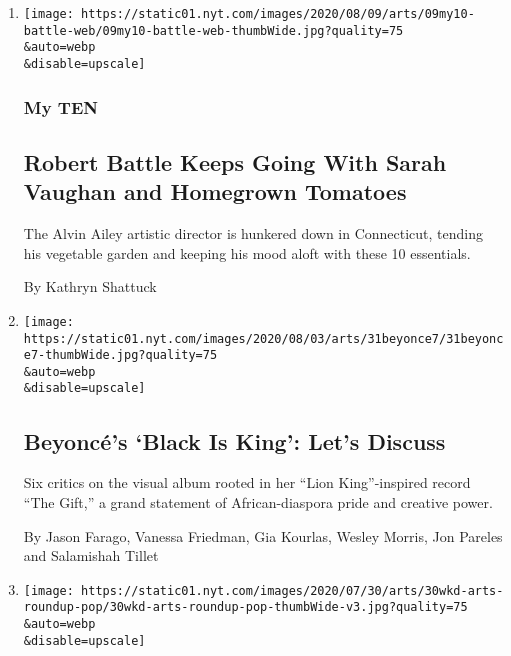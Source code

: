 \begin{enumerate}
\def\labelenumi{\arabic{enumi}.}
\item
  \href{/2020/08/04/arts/dance/robert-battle-favorites.html}{}

  \texttt{[image: https://static01.nyt.com/images/2020/08/09/arts/09my10-battle-web/09my10-battle-web-thumbWide.jpg?quality=75\\\&auto=webp\\\&disable=upscale]}

  \hypertarget{my-ten}{%
  \subsubsection{My TEN}\label{my-ten}}

  \hypertarget{robert-battle-keeps-going-with-sarah-vaughan-and-homegrown-tomatoes}{%
  \subsection{Robert Battle Keeps Going With Sarah Vaughan and Homegrown
  Tomatoes}\label{robert-battle-keeps-going-with-sarah-vaughan-and-homegrown-tomatoes}}

  The Alvin Ailey artistic director is hunkered down in Connecticut,
  tending his vegetable garden and keeping his mood aloft with these 10
  essentials.

  By Kathryn Shattuck
\item
  \href{/2020/07/31/arts/music/beyonce-black-is-king.html}{}

  \texttt{[image: https://static01.nyt.com/images/2020/08/03/arts/31beyonce7/31beyonce7-thumbWide.jpg?quality=75\\\&auto=webp\\\&disable=upscale]}

  \hypertarget{beyoncuxe9s-black-is-king-lets-discuss}{%
  \subsection{Beyoncé's `Black Is King': Let's
  Discuss}\label{beyoncuxe9s-black-is-king-lets-discuss}}

  Six critics on the visual album rooted in her ``Lion King''-inspired
  record ``The Gift,'' a grand statement of African-diaspora pride and
  creative power.

  By Jason Farago, Vanessa Friedman, Gia Kourlas, Wesley Morris, Jon
  Pareles and Salamishah Tillet
\item
  \href{/2020/07/30/arts/things-to-do-weekend-coronavirus.html}{}

  \texttt{[image: https://static01.nyt.com/images/2020/07/30/arts/30wkd-arts-roundup-pop/30wkd-arts-roundup-pop-thumbWide-v3.jpg?quality=75\\\&auto=webp\\\&disable=upscale]}


\end{enumerate}

